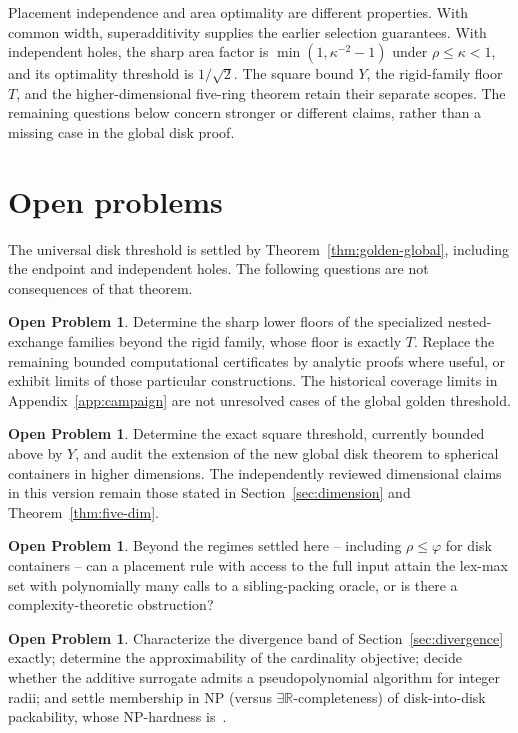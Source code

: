 \documentclass[11pt]{article}
\theoremstyle{definition}
\newtheorem{openproblem}[theorem]{Open Problem}
\begin{document}
Placement independence and area optimality are different properties.
With common width, superadditivity supplies the earlier selection
guarantees. With independent holes, the sharp area factor is
$\min(1,\kappa^{-2}-1)$ under $\rho\le\kappa<1$, and its optimality
threshold is $1/\sqrt2$. The square bound $Y$, the rigid-family floor
$T$, and the higher-dimensional five-ring theorem retain their separate
scopes. The remaining questions below concern stronger or different
claims, rather than a missing case in the global disk proof.

\section{Open problems}\label{sec:open}

The universal disk threshold is settled by
Theorem~\ref{thm:golden-global}, including the endpoint and independent
holes. The following questions are not consequences of that theorem.

\begin{openproblem}\label{op:assembly}
Determine the sharp lower floors of the specialized nested-exchange
families beyond the rigid family, whose floor is exactly $T$. Replace
the remaining bounded computational certificates by analytic proofs
where useful, or exhibit limits of those particular constructions.
The historical coverage limits in Appendix~\ref{app:campaign} are not
unresolved cases of the global golden threshold.
\end{openproblem}

\begin{openproblem}\label{op:squareglobal}
Determine the exact square threshold, currently bounded above by $Y$,
and audit the extension of the new global disk theorem to spherical
containers in higher dimensions. The independently reviewed dimensional
claims in this version remain those stated in
Section~\ref{sec:dimension} and Theorem~\ref{thm:five-dim}.
\end{openproblem}

\begin{openproblem}\label{op:oracle}
Beyond the regimes settled here -- including $\rho\le\varphi$
for disk containers -- can a placement rule
with access to the full input attain the lex-max set with
polynomially many calls to a sibling-packing oracle, or is there a
complexity-theoretic obstruction?
\end{openproblem}

\begin{openproblem}\label{op:misc}
Characterize the divergence band of Section~\ref{sec:divergence} exactly;
determine the approximability of the cardinality objective; decide whether
the additive surrogate admits a pseudopolynomial algorithm for integer
radii; and settle membership in NP (versus
$\exists\mathbb R$-completeness) of disk-into-disk packability, whose
NP-hardness is~\cite[Theorem~5.1]{FeketeKeldenichScheffer2019}.
\end{openproblem}
\end{document}
